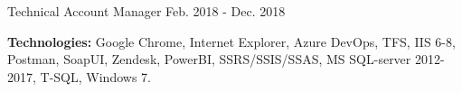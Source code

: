 \begin{cventries}
  \cventry
    {Technical Account Manager} %
    {} %
    {} %
    {Feb. 2018 - Dec. 2018} %
    {
      \begin{cvitems} %
		\item[] {\textbf{Technologies:} 
		\textcolor{rainbowcolor-olive}{Google Chrome}, 
		\textcolor{rainbowcolor-olive}{Internet Explorer}, 
		\textcolor{rainbowcolor-olive}{Azure DevOps}, 
		\textcolor{rainbowcolor-olive}{TFS}, 
		\textcolor{rainbowcolor-olive}{IIS 6-8}, 
		\textcolor{rainbowcolor-olive}{Postman}, 
		\textcolor{rainbowcolor-olive}{SoapUI}, 
		\textcolor{rainbowcolor-olive}{Zendesk}, 
		\textcolor{rainbowcolor-olive}{PowerBI}, 
		\textcolor{rainbowcolor-olive}{SSRS/SSIS/SSAS}, 
		\textcolor{rainbowcolor-olive}{MS SQL-server 2012-2017}, 
		\textcolor{rainbowcolor-indigo}{T-SQL}, 
		\textcolor{rainbowcolor-orange}{Windows 7}.}		
      \end{cvitems}
    } 
    

\end{cventries}
